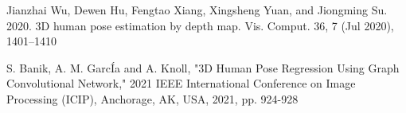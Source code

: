 \documentclass{article}
\begin{document}
\begin{thebibliography}{9}
 Jianzhai Wu, Dewen Hu, Fengtao Xiang, Xingsheng Yuan, and Jiongming Su. 2020. 3D human pose estimation by depth map. Vis. Comput. 36, 7 (Jul 2020), 1401–1410

 S. Banik, A. M. GarcÍa and A. Knoll, "3D Human Pose Regression Using Graph Convolutional Network," 2021 IEEE International Conference on Image Processing (ICIP), Anchorage, AK, USA, 2021, pp. 924-928

\end{thebibliography}
\end{document}
